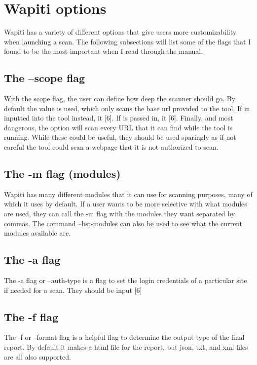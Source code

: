 \section{Wapiti options}\label{sec:opts}
Wapiti has a variety of different options that give users more customizability when launching a scan. The following subsections will list some of the flags that
I found to be the most important when I read through the manual.
\subsection{The --scope flag}
With the scope flag, the user can define how deep the scanner should go. By default the  value is used, which only scans the base url provided to the tool. If
 in inputted into the tool instead, it [6]. If  is passed in, it 
[6]. Finally, and most dangerous, the  option will scan every URL that it 
can find while the tool is running. While these could be useful, they should be used sparingly as if not careful the tool could scan a webpage that it is not authorized to scan.
\subsection{The -m flag (modules)}
Wapiti has many different modules that it can use for scanning purposes, many of which it uses by default. If a user wants to be more selective with what modules are
used, they can call the -m flag with the modules they want separated by commas. The command --list-modules can also be used to see what the current modules available are.
\subsection{The -a flag}
The -a flag or --auth-type is a flag to set the login credentials of a particular site if needed for a scan. They should be input [6]
\subsection{The -f flag}
The -f or --format flag is a helpful flag to determine the output type of the final report. By default it makes a html file for the report, but json, txt, and 
xml files are all also supported.
